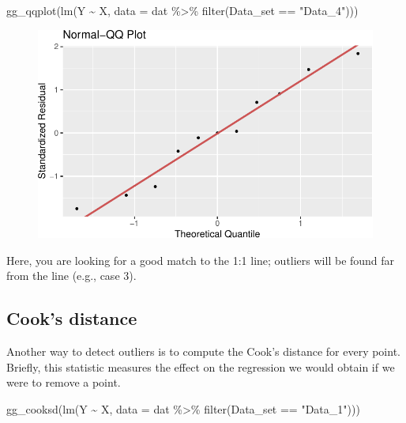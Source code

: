 \documentclass[
  letterpaper,
  DIV=11,
  numbers=noendperiod]{scrreprt}
\newenvironment{Shaded}{\begin{snugshade}}{\end{snugshade}}
\newcommand{\AttributeTok}[1]{\textcolor[rgb]{0.40,0.45,0.13}{#1}}
\newcommand{\FunctionTok}[1]{\textcolor[rgb]{0.28,0.35,0.67}{#1}}
\newcommand{\NormalTok}[1]{\textcolor[rgb]{0.00,0.23,0.31}{#1}}
\newcommand{\SpecialCharTok}[1]{\textcolor[rgb]{0.37,0.37,0.37}{#1}}
\newcommand{\StringTok}[1]{\textcolor[rgb]{0.13,0.47,0.30}{#1}}
\begin{document}
\begin{Shaded}
\begin{Highlighting}[]
\FunctionTok{gg\_qqplot}\NormalTok{(}\FunctionTok{lm}\NormalTok{(Y }\SpecialCharTok{\textasciitilde{}}\NormalTok{ X, }\AttributeTok{data =}\NormalTok{ dat }\SpecialCharTok{\%\textgreater{}\%} \FunctionTok{filter}\NormalTok{(Data\_set }\SpecialCharTok{==} \StringTok{"Data\_4"}\NormalTok{)))}
\end{Highlighting}
\end{Shaded}

\begin{figure}[H]

{\centering \includegraphics{./08-linearreg_files/figure-pdf/unnamed-chunk-27-4.pdf}

}

\end{figure}

Here, you are looking for a good match to the 1:1 line; outliers will be
found far from the line (e.g., case 3).

\hypertarget{cooks-distance}{%
\subsection{Cook's distance}\label{cooks-distance}}

Another way to detect outliers is to compute the Cook's distance for
every point. Briefly, this statistic measures the effect on the
regression we would obtain if we were to remove a point.

\begin{Shaded}
\begin{Highlighting}[]
\FunctionTok{gg\_cooksd}\NormalTok{(}\FunctionTok{lm}\NormalTok{(Y }\SpecialCharTok{\textasciitilde{}}\NormalTok{ X, }\AttributeTok{data =}\NormalTok{ dat }\SpecialCharTok{\%\textgreater{}\%} \FunctionTok{filter}\NormalTok{(Data\_set }\SpecialCharTok{==} \StringTok{"Data\_1"}\NormalTok{)))}
\end{Highlighting}
\end{Shaded}
\end{document}
